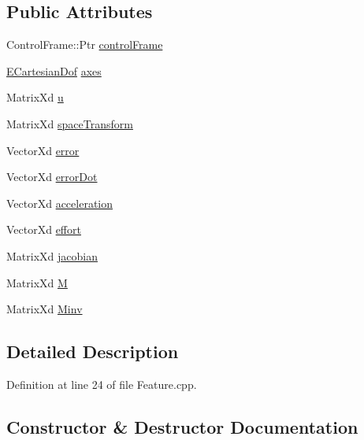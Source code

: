 \subsection*{Public Attributes}
\begin{DoxyCompactItemize}
\item 
Control\+Frame\+::\+Ptr \hyperlink{structocra_1_1PositionFeature_1_1Pimpl_ad770aac1608c2e6ccf13ee84539313c5}{control\+Frame}
\item 
\hyperlink{namespaceocra_a436781c7059a0f76027df1c652126260}{E\+Cartesian\+Dof} \hyperlink{structocra_1_1PositionFeature_1_1Pimpl_a671e502b35c4d7ec8c8f972933ebac1e}{axes}
\item 
Matrix\+Xd \hyperlink{structocra_1_1PositionFeature_1_1Pimpl_a5299db1f5f86c7a5808fbf1738ee438a}{u}
\item 
Matrix\+Xd \hyperlink{structocra_1_1PositionFeature_1_1Pimpl_a2e80e58cc94be8c44f8fee3dd030192e}{space\+Transform}
\item 
Vector\+Xd \hyperlink{structocra_1_1PositionFeature_1_1Pimpl_ab0c14028446505c11d15d0dfce51b97a}{error}
\item 
Vector\+Xd \hyperlink{structocra_1_1PositionFeature_1_1Pimpl_a3bff7b8d61a5575a68503d6767478950}{error\+Dot}
\item 
Vector\+Xd \hyperlink{structocra_1_1PositionFeature_1_1Pimpl_a2a251a27da0e093461ba88a7dcb5ce1d}{acceleration}
\item 
Vector\+Xd \hyperlink{structocra_1_1PositionFeature_1_1Pimpl_a66425331a37215913daa3ca7de5bce57}{effort}
\item 
Matrix\+Xd \hyperlink{structocra_1_1PositionFeature_1_1Pimpl_a9cd18a0039e2ebbce05d78403667dd02}{jacobian}
\item 
Matrix\+Xd \hyperlink{structocra_1_1PositionFeature_1_1Pimpl_aa061dcd02d8f11de5edd55e8f2535bfe}{M}
\item 
Matrix\+Xd \hyperlink{structocra_1_1PositionFeature_1_1Pimpl_a7f6b8df16f7f9cbbe8e917e3ed4811eb}{Minv}
\end{DoxyCompactItemize}


\subsection{Detailed Description}


Definition at line 24 of file Feature.\+cpp.



\subsection{Constructor \& Destructor Documentation}
\hypertarget{structocra_1_1PositionFeature_1_1Pimpl_ad886f374a5f070290519a8ccbaff9ab8}{}\label{structocra_1_1PositionFeature_1_1Pimpl_ad886f374a5f070290519a8ccbaff9ab8} 
